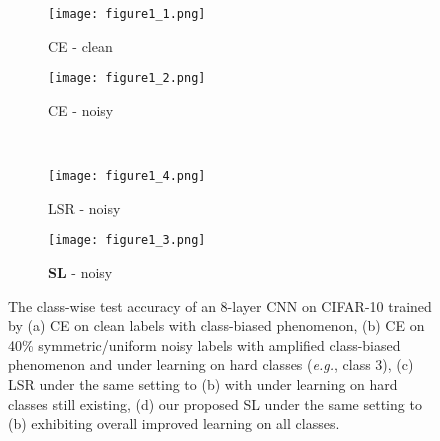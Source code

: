 \documentclass[10pt,twocolumn,letterpaper]{article}
\begin{document}
\begin{figure}[!t]
	\centering
	\begin{subfigure}{0.49\linewidth}
		\texttt{[image: figure1\_1.png]}
		\caption{CE - clean}
		\label{ce_clean}
	\end{subfigure}
	\begin{subfigure}{0.49\linewidth} 
		\texttt{[image: figure1\_2.png]}
		\caption{CE - noisy} 
		\label{ce_noisy}
	\end{subfigure}\\
	\begin{subfigure}{0.49\linewidth}
		\texttt{[image: figure1\_4.png]}
		\caption{LSR - noisy}
		\label{lsr_noisy}
	\end{subfigure}
	\begin{subfigure}{0.49\linewidth}
		\texttt{[image: figure1\_3.png]}
		\caption{\textbf{SL} - noisy}
		\label{sce_noisy}
	\end{subfigure}
	\vspace{-0.1 in}
	\caption{The class-wise test accuracy of an 8-layer CNN on CIFAR-10 trained by (a) CE on clean labels with class-biased phenomenon, (b) CE on 40\% symmetric/uniform noisy labels with amplified class-biased phenomenon and under learning on hard classes (\textit{e.g.}, class 3), (c) LSR under the same setting to (b) with under learning on hard classes still existing, (d) our proposed SL under the same setting to (b) exhibiting overall improved learning on all classes.}
	\label{figure1}
	\vspace{-0.15 in}
\end{figure}
\end{document}
